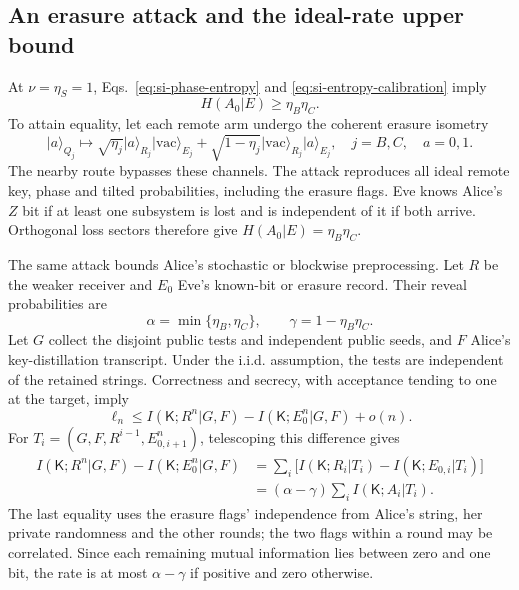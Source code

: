\documentclass[aps,10pt,onecolumn,prx,superscriptaddress,longbibliography,nofootinbib]{revtex4-2}
\newcommand{\ket}[1]{\lvert #1\rangle}
\begin{document}
\subsection{An erasure attack and the ideal-rate upper bound}\label{app:ideal}

At \(\nu=\eta_S=1\), Eqs.~\eqref{eq:si-phase-entropy} and \eqref{eq:si-entropy-calibration} imply
\begin{equation}
 H(A_0|E)\geq\eta_B\eta_C.
 \label{eq:si-ideal-lower}
\end{equation}
To attain equality, let each remote arm undergo the coherent erasure isometry
\begin{equation}
 \ket{a}_{Q_j}\longmapsto
 \sqrt{\eta_j}\ket{a}_{R_j}\ket{\mathrm{vac}}_{E_j}
 +\sqrt{1-\eta_j}\ket{\mathrm{vac}}_{R_j}\ket{a}_{E_j},
 \quad j=B,C,\quad a=0,1.
 \label{eq:si-erasure-isometry}
\end{equation}
The nearby route bypasses these channels. The attack reproduces all ideal remote key, phase and tilted probabilities, including the erasure flags. Eve knows Alice's \(Z\) bit if at least one subsystem is lost and is independent of it if both arrive. Orthogonal loss sectors therefore give \(H(A_0|E)=\eta_B\eta_C\).

The same attack bounds Alice's stochastic or blockwise preprocessing. Let \(R\) be the weaker receiver and \(E_0\) Eve's known-bit or erasure record. Their reveal probabilities are
\begin{equation}
 \alpha=\min\{\eta_B,\eta_C\},\qquad \gamma=1-\eta_B\eta_C.
\end{equation}
Let \(G\) collect the disjoint public tests and independent public seeds, and \(F\) Alice's key-distillation transcript. Under the i.i.d. assumption, the tests are independent of the retained strings. Correctness and secrecy, with acceptance tending to one at the target, imply
\begin{equation}
 \ell_n\leq I(\mathsf K;R^n|G,F)-I(\mathsf K;E_0^n|G,F)+o(n).
 \label{eq:si-converse-start}
\end{equation}
For \(T_i=(G,F,R^{i-1},E_{0,i+1}^n)\), telescoping this difference gives
\begin{align}
 I(\mathsf K;R^n|G,F)-I(\mathsf K;E_0^n|G,F)
 &=\sum_i\bigl[I(\mathsf K;R_i|T_i)-I(\mathsf K;E_{0,i}|T_i)\bigr]\nonumber\\
 &=(\alpha-\gamma)\sum_i I(\mathsf K;A_i|T_i).
 \label{eq:si-erasure-converse}
\end{align}
The last equality uses the erasure flags' independence from Alice's string, her private randomness and the other rounds; the two flags within a round may be correlated. Since each remaining mutual information lies between zero and one bit, the rate is at most \(\alpha-\gamma\) if positive and zero otherwise.
\end{document}
